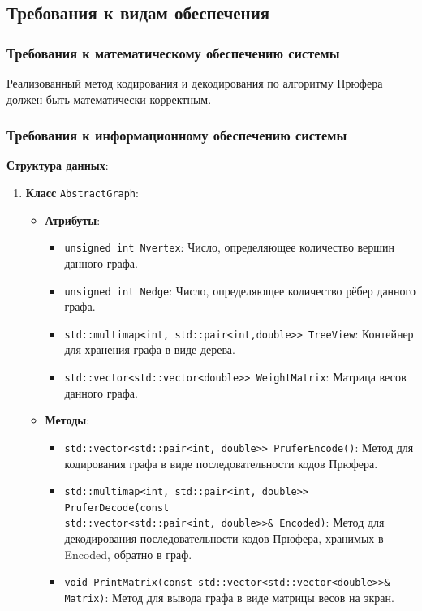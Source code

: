 \documentclass[12pt,a4paper]{article}
\begin{document}
\subsection{Требования к видам обеспечения}
\subsubsection{Требования к математическому обеспечению системы}
Реализованный метод кодирования и декодирования по алгоритму Прюфера должен быть математически корректным.

\subsubsection{Требования к информационному обеспечению системы}
\textbf{Структура данных}:
\begin{enumerate}
    \item \textbf{Класс} \texttt{AbstractGraph}:
        \begin{itemize}
            \item \textbf{Атрибуты}:
            \begin{itemize}
                \item \texttt{unsigned int Nvertex}: Число, определяющее количество вершин данного графа.
                \item \texttt{unsigned int Nedge}: Число, определяющее количество рёбер данного графа.
                \item \texttt{std::multimap<int, std::pair<int,double{>}{>} TreeView}: Контейнер для хранения графа в
                виде дерева.
                \item \texttt{std::vector<std::vector<double{>}{>} WeightMatrix}: Матрица весов данного графа.
            \end{itemize}

            \item \textbf{Методы}:
            \begin{itemize}
                \item \texttt{std::vector<std::pair<int, double{>}{>} PruferEncode()}: Метод для кодирования графа в виде
                последовательности кодов Прюфера.
                \item \texttt{std::multimap<int, std::pair<int, double{>}{>} PruferDecode(const \\ 
                std::vector<std::pair<int, double{>}{>}\& Encoded)}: 
                    Метод для декодирования последовательности кодов Прюфера, хранимых в Encoded, обратно в граф.
                \item \texttt{void PrintMatrix(const std::vector<std::vector<double{>}{>}\& Matrix)}: Метод для вывода
                графа в виде матрицы весов на экран.
            \end{itemize}
        \end{itemize}
    

\end{enumerate}
\end{document}
